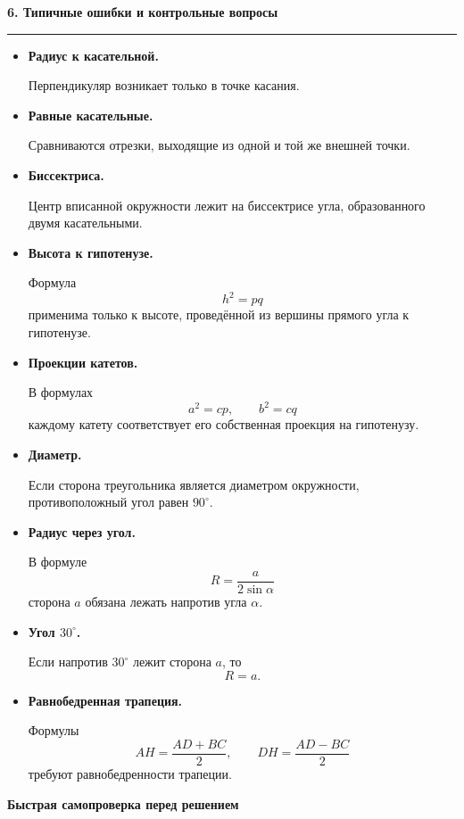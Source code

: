 \documentclass[a4paper,12pt]{article}
\newcommand{\Section}[1]{%
    \vspace{0.4em}%
    {\Large\bfseries\color{darkaccent}#1}\par
    \vspace{0.25em}
    \noindent
    \textcolor{linegray}{\rule{\linewidth}{0.6pt}}
    \vspace{0.5em}%
}
\newcommand{\Subsection}[1]{%
    \vspace{0.3em}%
    {\large\bfseries\color{accent}#1}\par
    \vspace{0.25em}%
}
\newcommand{\Key}[1]{%
    \textbf{\textcolor{darkaccent}{#1}}%
}
\begin{document}
\Section{6. Типичные ошибки и контрольные вопросы}

\begin{itemize}

    \item
    \Key{Радиус к касательной.}
    Перпендикуляр возникает только
    в точке касания.

    \item
    \Key{Равные касательные.}
    Сравниваются отрезки,
    выходящие из одной и той же внешней точки.

    \item
    \Key{Биссектриса.}
    Центр вписанной окружности
    лежит на биссектрисе угла,
    образованного двумя касательными.

    \item
    \Key{Высота к гипотенузе.}
    Формула
    \[
        h^2=pq
    \]
    применима только к высоте,
    проведённой из вершины прямого угла
    к гипотенузе.

    \item
    \Key{Проекции катетов.}
    В формулах
    \[
        a^2=cp,
        \qquad
        b^2=cq
    \]
    каждому катету соответствует
    его собственная проекция на гипотенузу.

    \item
    \Key{Диаметр.}
    Если сторона треугольника
    является диаметром окружности,
    противоположный угол равен $90^\circ$.

    \item
    \Key{Радиус через угол.}
    В формуле
    \[
        R=\frac{a}{2\sin\alpha}
    \]
    сторона $a$ обязана лежать
    напротив угла $\alpha$.

    \item
    \Key{Угол $30^\circ$.}
    Если напротив $30^\circ$
    лежит сторона $a$, то
    \[
        R=a.
    \]

    \item
    \Key{Равнобедренная трапеция.}
    Формулы
    \[
        AH=\frac{AD+BC}{2},
        \qquad
        DH=\frac{AD-BC}{2}
    \]
    требуют равнобедренности трапеции.

\end{itemize}

\Subsection{Быстрая самопроверка перед решением}
\end{document}
